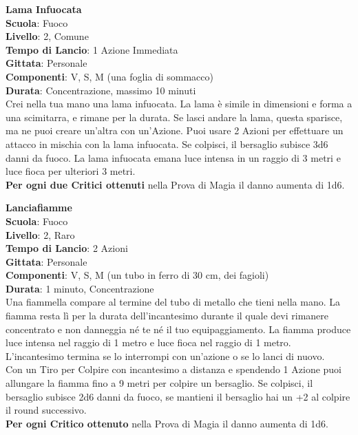 \begin{multicols}{2}
\medskip\textbf{Lama Infuocata}\\
\textbf{Scuola}: Fuoco\\
\textbf{Livello}: 2, Comune\\
\textbf{Tempo di Lancio}: 1 Azione Immediata\\
\textbf{Gittata}: Personale\\
\textbf{Componenti}: V, S, M (una foglia di sommacco)\\
\textbf{Durata}: Concentrazione, massimo 10 minuti \\
Crei nella tua mano una lama infuocata. La lama è simile in dimensioni e forma a una scimitarra, e rimane per la durata. Se lasci andare la lama, questa sparisce, ma ne puoi creare un'altra con un'Azione. Puoi usare 2 Azioni per effettuare un attacco in mischia con la lama infuocata. Se colpisci, il bersaglio subisce 3d6 danni da fuoco. La lama infuocata emana luce intensa in un raggio di 3 metri e luce fioca per ulteriori 3 metri.\\
\textbf{Per ogni due Critici ottenuti} nella Prova di Magia il danno aumenta di 1d6.

\medskip\textbf{Lanciafiamme}\\
\textbf{Scuola}: Fuoco\\
\textbf{Livello}: 2, Raro\\
\textbf{Tempo di Lancio}: 2 Azioni\\
\textbf{Gittata}: Personale\\
\textbf{Componenti}: V, S, M (un tubo in ferro di 30 cm, dei fagioli)\\
\textbf{Durata}: 1 minuto, Concentrazione\\
Una fiammella compare al termine del tubo di metallo che tieni nella mano. La fiamma resta lì per la durata dell'incantesimo durante il quale devi rimanere concentrato e non danneggia né te né il tuo equipaggiamento. La fiamma produce luce intensa nel raggio di 1 metro e luce fioca nel raggio di 1 metro. L'incantesimo termina se lo interrompi con un'azione o se lo lanci di nuovo.\\
Con un Tiro per Colpire con incantesimo a distanza e spendendo 1 Azione puoi allungare la fiamma fino a 9 metri per colpire un bersaglio. Se colpisci, il bersaglio subisce 2d6 danni da fuoco, se mantieni il bersaglio hai un +2 al colpire il round successivo.\\
\textbf{Per ogni Critico ottenuto} nella Prova di Magia il danno aumenta di 1d6.


\end{multicols}
